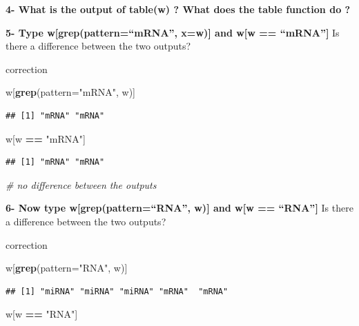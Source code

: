\documentclass[]{book}
\newenvironment{Shaded}{\begin{snugshade}}{\end{snugshade}}
\newcommand{\CommentTok}[1]{\textcolor[rgb]{0.56,0.35,0.01}{\textit{#1}}}
\newcommand{\DataTypeTok}[1]{\textcolor[rgb]{0.13,0.29,0.53}{#1}}
\newcommand{\KeywordTok}[1]{\textcolor[rgb]{0.13,0.29,0.53}{\textbf{#1}}}
\newcommand{\NormalTok}[1]{#1}
\newcommand{\OperatorTok}[1]{\textcolor[rgb]{0.81,0.36,0.00}{\textbf{#1}}}
\newcommand{\StringTok}[1]{\textcolor[rgb]{0.31,0.60,0.02}{#1}}
\begin{document}
\textbf{4- What is the output of table(w) ? What does the table function do ?}

\textbf{5- Type w{[}grep(pattern=``mRNA'', x=w){]} and w{[}w == ``mRNA''{]}}
 Is there a difference between the two outputs?

correction

\begin{Shaded}
\begin{Highlighting}[]
\NormalTok{w[}\KeywordTok{grep}\NormalTok{(}\DataTypeTok{pattern=}\StringTok{"mRNA"}\NormalTok{, w)]}
\end{Highlighting}
\end{Shaded}

\begin{verbatim}
## [1] "mRNA" "mRNA"
\end{verbatim}

\begin{Shaded}
\begin{Highlighting}[]
\NormalTok{w[w }\OperatorTok{==}\StringTok{ "mRNA"}\NormalTok{]}
\end{Highlighting}
\end{Shaded}

\begin{verbatim}
## [1] "mRNA" "mRNA"
\end{verbatim}

\begin{Shaded}
\begin{Highlighting}[]
\CommentTok{# no difference between the outputs}
\end{Highlighting}
\end{Shaded}

\textbf{6- Now type w{[}grep(pattern=``RNA'', w){]} and w{[}w == ``RNA''{]}}
 Is there a difference between the two outputs?

correction

\begin{Shaded}
\begin{Highlighting}[]
\NormalTok{w[}\KeywordTok{grep}\NormalTok{(}\DataTypeTok{pattern=}\StringTok{"RNA"}\NormalTok{, w)]}
\end{Highlighting}
\end{Shaded}

\begin{verbatim}
## [1] "miRNA" "miRNA" "miRNA" "mRNA"  "mRNA"
\end{verbatim}

\begin{Shaded}
\begin{Highlighting}[]
\NormalTok{w[w }\OperatorTok{==}\StringTok{ "RNA"}\NormalTok{]}
\end{Highlighting}
\end{Shaded}
\end{document}
